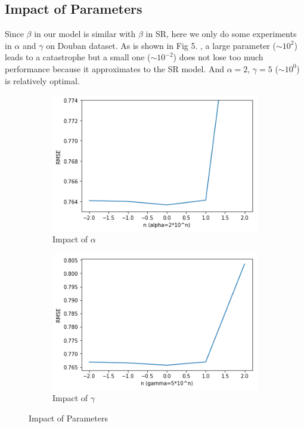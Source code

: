 \documentclass{article}
\begin{document}
\subsection{Impact of Parameters}
Since $\beta$ in our model is similar with $\beta$ in SR, here we 
only do some experiments in $\alpha$ and $\gamma$ on Douban dataset. 
As is shown in Fig 5. , a large parameter ($\sim 10^2$) 
leads to a catastrophe but a small one ($\sim 10^{-2}$) does not lose too much performance 
because it approximates to the SR model. 
And $\alpha=2$, $\gamma=5$ ($\sim 10^{0}$) is relatively optimal.
\begin{figure}[h]    
  \centering
  \begin{subfigure}{0.4\textwidth}
    \centering
      \includegraphics[width=1\linewidth]{pic/figure5_1.png}
    \caption{Impact of $\alpha$}
  \end{subfigure}%
  \begin{subfigure}{0.4\textwidth}
  \centering
      \includegraphics[width=1\linewidth]{pic/figure5_2.png}
    \caption{Impact of $\gamma$}
  \end{subfigure}%
\caption{Impact of Parameters}
\end{figure}
\end{document}
